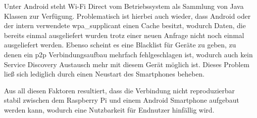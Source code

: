 		Unter Android steht Wi-Fi Direct vom Betriebssystem als Sammlung von Java Klassen zur Verfügung. Problematisch ist hierbei auch wieder, dass Android oder der intern verwendete wpa\_supplicant einen Cache besitzt, wodurch Daten, die bereits einmal ausgeliefert wurden trotz einer neuen Anfrage nicht noch einmal ausgeliefert werden. Ebenso scheint es eine Blacklist für Geräte zu geben, zu denen ein p2p Verbindungsaufbau mehrfach fehlgeschlagen ist, wodurch auch kein Service Discovery Austausch mehr mit diesem Gerät möglich ist. Dieses Problem ließ sich lediglich durch einen Neustart des Smartphones beheben.
		
		Aus all diesen Faktoren resultiert, dass die Verbindung nicht reproduzierbar stabil zwischen dem Raspberry Pi und einem Android Smartphone aufgebaut werden kann, wodurch eine Nutzbarkeit für Endnutzer hinfällig wird.